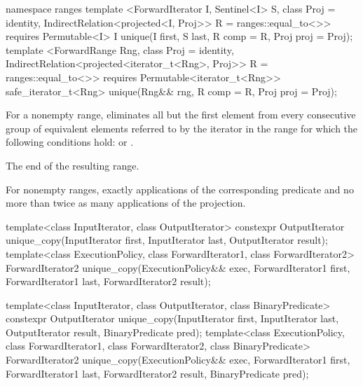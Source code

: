 \begin{addedblock}
%
\begin{itemdecl}
namespace ranges {
  template <ForwardIterator I, Sentinel<I> S, class Proj = identity,
            IndirectRelation<projected<I, Proj>> R = ranges::equal_to<>>
      requires Permutable<I>
    I unique(I first, S last, R comp = R{}, Proj proj = Proj{});
  template <ForwardRange Rng, class Proj = identity,
            IndirectRelation<projected<iterator_t<Rng>, Proj>> R = ranges::equal_to<>>
      requires Permutable<iterator_t<Rng>>
    safe_iterator_t<Rng> unique(Rng&& rng, R comp = R{}, Proj proj = Proj{});
}
\end{itemdecl}

\begin{itemdescr}
\pnum
\effects
For a nonempty range, eliminates all but the first element from every
consecutive group of equivalent elements referred to by the iterator
in the range
for which the following conditions hold:
or
.

\pnum
\returns
The end of the resulting range.

\pnum
\complexity
For nonempty ranges, exactly
applications of the corresponding predicate and no more than twice as many
applications of the projection.
\end{itemdescr}
\end{addedblock}

%
\begin{itemdecl}
template<class InputIterator, class OutputIterator>
  constexpr OutputIterator
    unique_copy(InputIterator first, InputIterator last,
                OutputIterator result);
template<class ExecutionPolicy, class ForwardIterator1, class ForwardIterator2>
  ForwardIterator2
    unique_copy(ExecutionPolicy&& exec,
                ForwardIterator1 first, ForwardIterator1 last,
                ForwardIterator2 result);

template<class InputIterator, class OutputIterator,
         class BinaryPredicate>
  constexpr OutputIterator
    unique_copy(InputIterator first, InputIterator last,
                OutputIterator result, BinaryPredicate pred);
template<class ExecutionPolicy, class ForwardIterator1, class ForwardIterator2,
         class BinaryPredicate>
  ForwardIterator2
    unique_copy(ExecutionPolicy&& exec,
                ForwardIterator1 first, ForwardIterator1 last,
                ForwardIterator2 result, BinaryPredicate pred);
\end{itemdecl}

